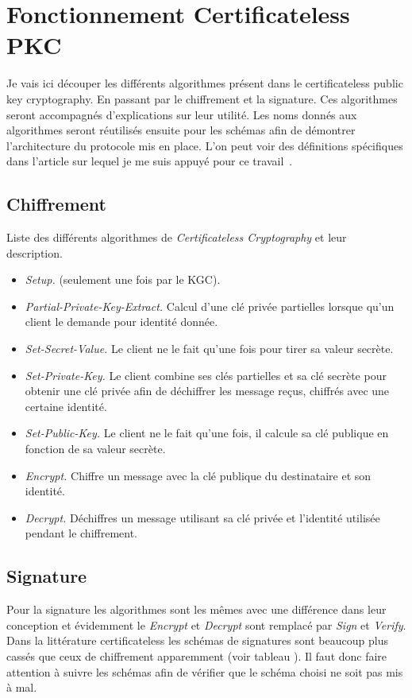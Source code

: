 \section{Fonctionnement Certificateless PKC}
Je vais ici découper les différents algorithmes présent dans le certificateless public key cryptography. En passant par le chiffrement et la signature.
Ces algorithmes seront accompagnés d'explications sur leur utilité. Les noms donnés aux algorithmes seront réutilisés ensuite pour les schémas afin de démontrer l'architecture du protocole mis en place. L'on peut voir des définitions spécifiques dans l'article sur lequel je me suis appuyé pour ce travail~\cite{DBLP:conf/pkc/DentLP08}.
\subsection{Chiffrement}
Liste des différents algorithmes de \textit{Certificateless Cryptography} et leur description.
\begin{itemize}
	\item \textit{Setup.} (seulement une fois par le KGC).
	\item \textit{Partial-Private-Key-Extract.} Calcul d'une clé privée partielles lorsque qu'un client le demande pour identité donnée.
	\item \textit{Set-Secret-Value.} Le client ne le fait qu'une fois pour tirer sa valeur secrète.
	\item \textit{Set-Private-Key.} Le client combine ses clés partielles et sa clé secrète pour obtenir une clé privée afin de déchiffrer les message reçus, chiffrés avec une certaine identité.
	\item \textit{Set-Public-Key.} Le client ne le fait qu'une fois, il calcule sa clé publique en fonction de sa valeur secrète.
	\item \textit{Encrypt.} Chiffre un message avec la clé publique du destinataire et son identité.
	\item \textit{Decrypt.} Déchiffres un message utilisant sa clé privée et l'identité utilisée pendant le chiffrement.
\end{itemize}
\subsection{Signature}
Pour la signature les algorithmes sont les mêmes avec une différence dans leur conception et évidemment le \textit{Encrypt} et \textit{Decrypt} sont remplacé par \textit{Sign} et \textit{Verify}.
Dans la littérature certificateless les schémas de signatures sont beaucoup plus cassés que ceux de chiffrement apparemment (voir tableau ). Il faut donc faire attention à suivre les schémas afin de vérifier que le schéma choisi ne soit pas mis à mal.

